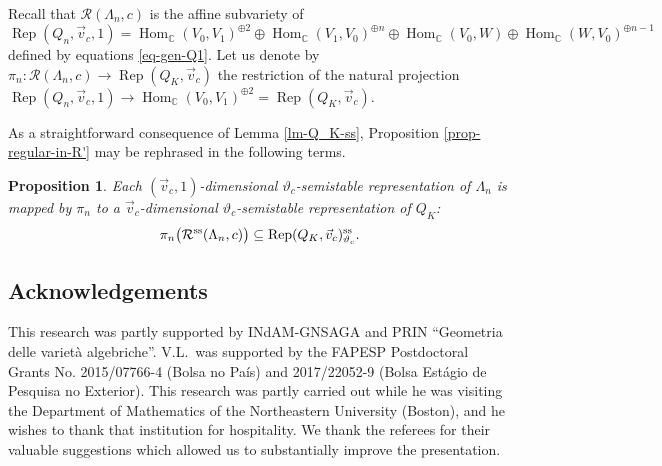 \documentclass[pdftex]{sigma}
\numberwithin{equation}{section}
\newtheorem{Proposition}[Theorem]{Proposition}
 { \theoremstyle{definition}
\newtheorem{Definition}[Theorem]{Definition}
\newtheorem{Remark}[Theorem]{Remark} }
\begin{document}
Recall that $\mathcal{R}(\Lambda_n, c)$ is the affine subvariety of
\[
\operatorname{Rep}(Q_n, \vec{v}_c, 1) = \operatorname{Hom}_\mathbb{C}(V_0,V_1)^{\oplus2}\oplus\operatorname{Hom}_\mathbb{C}(V_1,V_0)^{\oplus n}\oplus\operatorname{Hom}_\mathbb{C}(V_0,W)\oplus\operatorname{Hom}_\mathbb{C}(W,V_0)^{\oplus n-1}
\]
defined by equations \eqref{eq-gen-Q1}.
Let us denote by $\pi_n \colon \mathcal{R}(\Lambda_n, c) \to \operatorname{Rep}(Q_K, \vec{v}_c)$ the restriction of the natural projection
$\operatorname{Rep}(Q_n, \vec{v}_c, 1) \to \operatorname{Hom}_\mathbb{C}(V_0,V_1)^{\oplus2}= \operatorname{Rep}(Q_K, \vec{v}_c)$.

As a straightforward consequence of Lemma \ref{lm-Q_K-ss}, Proposition \ref{prop-regular-in-R'} may be rephrased in the following terms.
\begin{Proposition}\label{relGIT} Each $(\vec{v}_c, 1)$-dimensional $\vartheta_c$-semistable representation of $\Lambda_n$ is mapped by $\pi_n$ to a $\vec{v}_c$-dimensional $\vartheta_c$-semistable representation of $Q_K$:
\[\pi_n\bigl( \mathcal{R}^{\rm ss}(\Lambda_n, c)\bigr) \subseteq \operatorname{Rep}(Q_K, \vec{v}_c)_{\vartheta_c}^{\rm ss} .\]
\end{Proposition}

\subsection*{Acknowledgements}

This research was partly supported by INdAM-GNSAGA and PRIN ``Geometria delle variet\`a algebriche''. V.L.~was supported by the FAPESP Postdoctoral Grants No. 2015/07766-4 (Bolsa no Pa\'is) and 2017/22052-9 (Bolsa Est\'agio de Pesquisa no Exterior). This research was partly carried out while he was visiting the Department of Mathematics of the Northeastern University (Boston), and he wishes to thank that institution for hospitality. We thank the referees for their valuable suggestions which allowed us to substantially improve the presentation.
\end{document}
